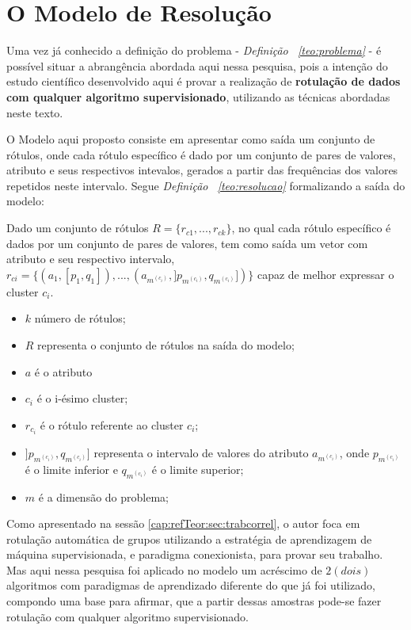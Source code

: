 \section{O Modelo de Resolução}\label{cap:ferramentas:sec:modeloresolucao}

Uma vez já conhecido a definição do problema - \textit{Definição ~\ref{teo:problema}} - é possível situar a abrangência abordada aqui nessa pesquisa, pois a intenção do estudo científico desenvolvido aqui é provar a realização de \textbf{rotulação de dados com qualquer algoritmo supervisionado}, utilizando as técnicas abordadas neste texto.

O Modelo aqui proposto consiste em apresentar como saída um conjunto de rótulos, onde cada rótulo específico é dado por um conjunto de pares de valores, atributo e seus respectivos intevalos, gerados a partir das frequências dos valores repetidos neste intervalo. Segue \textit{Definição ~\ref{teo:resolucao}} formalizando a saída do modelo:
    \begin{teorema}
    Dado um conjunto de rótulos ${ R=\{ r_{c1},...,r_{ck} \} }$, no qual cada rótulo específico é dados por um conjunto de pares de valores, tem como saída um vetor com atributo e seu respectivo intervalo, ${ r_{ci}=\{ (a_1,[p_1,q_1]),...,(a_{m^{(c_i)}}, ]p_{m^{(c_i)}},q_{m^{(c_i)}}]) \} }$ capaz de melhor expressar o cluster ${c_i}$.
        \footnotemark 
        \begin{itemize}[noitemsep]
            \item ${k}$ número de rótulos;
            \item ${R}$ representa o conjunto de rótulos na saída do modelo;
            \item ${a}$ é o atributo
            \item ${c_i}$ é o i-ésimo cluster;
            \item ${r_{c_i}}$ é o rótulo referente ao cluster ${c_i}$;
            \item ${]p_{m^{(c_i)}},q_{m^{(c_i)}}]}$ representa o intervalo de valores do atributo ${a_{m^{(c_i)}} }$, onde ${ p_{m^{(c_i)}} }$  é o limite inferior e ${ q_{m^{(c_i)}} }$ é o limite superior;
            \item ${m}$ é a dimensão do problema;
        \end{itemize}
    \label{teo:resolucao}
    \end{teorema}

Como apresentado na sessão \ref{cap:refTeor:sec:trabcorrel}, o autor foca em rotulação automática de grupos utilizando a estratégia de aprendizagem de máquina supervisionada, e paradigma conexionista, para provar seu trabalho. Mas aqui nessa pesquisa foi aplicado no modelo um acréscimo de ${2 (dois)}$ algoritmos com paradigmas de aprendizado diferente do que já foi utilizado, compondo uma base para afirmar, que a partir dessas amostras pode-se fazer rotulação com qualquer algoritmo supervisionado.


